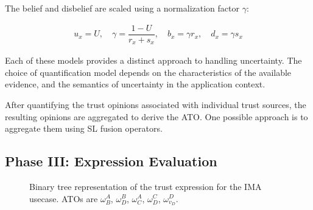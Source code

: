 \begin{enumerate}
    The belief and disbelief are scaled using a normalization factor $\gamma$:

    \begin{equation}
    \label{eq:constant_quant_meth}
    \begin{aligned}
        u_x = U, \quad
        \gamma = \dfrac{1-U}{r_x + s_x}, \quad
        b_x = \gamma r_x, \quad
        d_x = \gamma s_x
    \end{aligned}
    \end{equation}

\end{enumerate}

Each of these models provides a distinct approach to handling uncertainty. The choice of quantification model depends on the characteristics of the available evidence, and the semantics of uncertainty in the application context.

After quantifying the trust opinions associated with individual trust sources, the resulting opinions are aggregated to derive the \ac{ATO}. One possible approach is to aggregate them using \ac{SL} fusion operators.


\subsection{Phase III: Expression Evaluation}
\label{subsec:ch4_expression_evaluation}
\begin{figure}[t]
\centering
{}
\caption{Binary tree representation of the trust expression for the \ac{IMA} usecase. \acp{ATO} are $\omega^A_B$, $\omega^B_D$, $\omega^A_C$, $\omega^C_D$, $\omega^D_{v_D}$.}
\label{fig:trust_expression_tree}
\end{figure}

